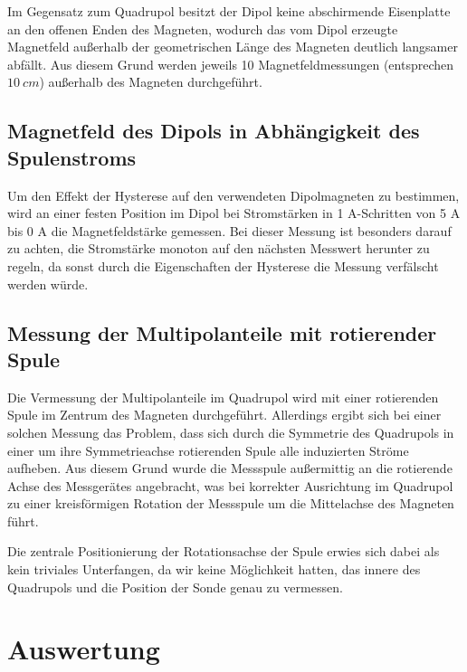 \documentclass[bigchapter,colorback,accentcolor=tud4b,linedtoc,11pt]{tudreport}
\begin{document}
Im Gegensatz zum Quadrupol besitzt der Dipol keine abschirmende Eisenplatte an den offenen Enden des Magneten, wodurch das vom Dipol erzeugte Magnetfeld außerhalb der geometrischen Länge des Magneten deutlich langsamer abfällt. Aus diesem Grund werden jeweils 10 Magnetfeldmessungen (entsprechen $10~cm$) außerhalb des Magneten durchgeführt.

\section{Magnetfeld des Dipols in Abhängigkeit des Spulenstroms}

Um den Effekt der Hysterese auf den verwendeten Dipolmagneten zu bestimmen, wird an einer festen Position im Dipol bei Stromstärken in 1 A-Schritten von 5 A bis 0 A die Magnetfeldstärke gemessen. Bei dieser Messung ist besonders darauf zu achten, die Stromstärke monoton auf den nächsten Messwert herunter zu regeln, da sonst durch die Eigenschaften der Hysterese die Messung verfälscht werden würde.

\section{Messung der Multipolanteile mit rotierender Spule}
Die Vermessung der Multipolanteile im Quadrupol wird mit einer rotierenden Spule im Zentrum des Magneten durchgeführt. Allerdings ergibt sich bei einer solchen Messung das Problem, dass sich durch die Symmetrie des Quadrupols in einer um ihre Symmetrieachse rotierenden Spule alle induzierten Ströme aufheben. Aus diesem Grund wurde die Messspule außermittig an die rotierende Achse des Messgerätes angebracht, was bei korrekter Ausrichtung im Quadrupol zu einer kreisförmigen Rotation der Messspule um die Mittelachse des Magneten führt.

Die zentrale Positionierung der Rotationsachse der Spule erwies sich dabei als kein triviales Unterfangen, da wir keine Möglichkeit hatten, das innere des Quadrupols und die Position der Sonde genau zu vermessen.


\chapter{Auswertung}
\end{document}
